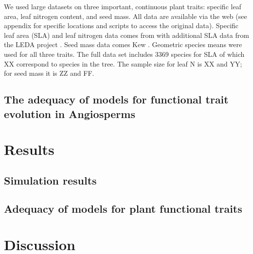 \documentclass[12pt]{article}
\begin{document}

We used large datasets on three important, continuous plant traits: specific leaf area, leaf nitrogen content, and seed mass.  All data are available via the web (see appendix for specific locations and scripts to access the original data). Specific leaf area (SLA) and leaf nitrogen data comes from \citet{Wright2004} with additional SLA data from the LEDA project \citep{Kleyer2008}.   Seed mass data comes Kew \citep{Kew}.  Geometric species means were used for all three traits.  The full data set includes 3369 species for SLA of which XX correspond to species in the \citet{Zanne2003} tree.  The sample size for leaf N is XX and YY; for seed mass it is ZZ and FF.  


\subsection*{The adequacy of models for functional trait evolution in Angiosperms}


\section*{Results}

\subsection*{Simulation results}

\subsection*{Adequacy of models for plant functional traits}

\section*{Discussion}
\end{document}
